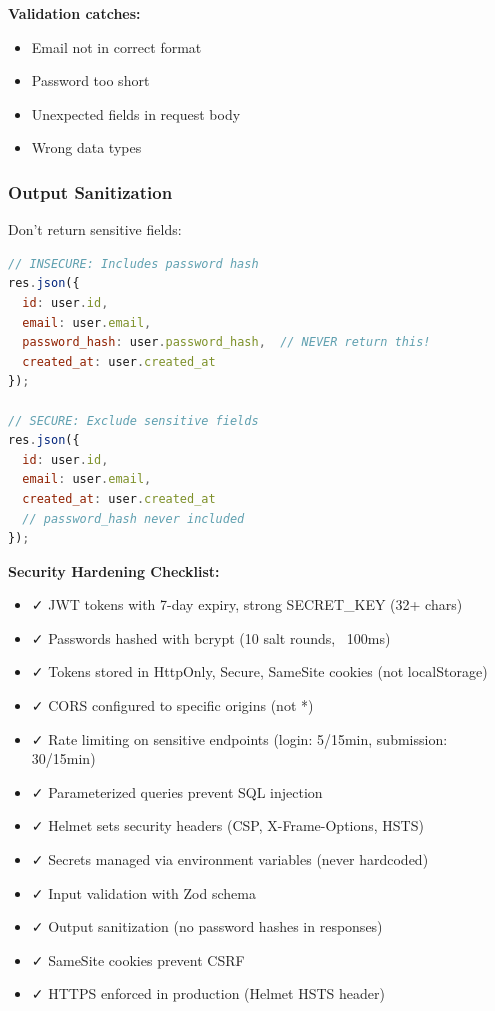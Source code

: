 \documentclass[12pt,a4paper,oneside]{article}
\begin{document}
\textbf{Validation catches:}

\begin{itemize}
    \item Email not in correct format
    \item Password too short
    \item Unexpected fields in request body
    \item Wrong data types
\end{itemize}

\subsubsection{Output Sanitization}

Don't return sensitive fields:

\begin{lstlisting}[language=JavaScript, caption=Sanitized Response]
// INSECURE: Includes password hash
res.json({
  id: user.id,
  email: user.email,
  password_hash: user.password_hash,  // NEVER return this!
  created_at: user.created_at
});

// SECURE: Exclude sensitive fields
res.json({
  id: user.id,
  email: user.email,
  created_at: user.created_at
  // password_hash never included
});
\end{lstlisting}

\begin{importantbox}
\textbf{Security Hardening Checklist:}

\begin{itemize}
    \item ✓ JWT tokens with 7-day expiry, strong SECRET_KEY (32+ chars)
    \item ✓ Passwords hashed with bcrypt (10 salt rounds, ~100ms)
    \item ✓ Tokens stored in HttpOnly, Secure, SameSite cookies (not localStorage)
    \item ✓ CORS configured to specific origins (not *)
    \item ✓ Rate limiting on sensitive endpoints (login: 5/15min, submission: 30/15min)
    \item ✓ Parameterized queries prevent SQL injection
    \item ✓ Helmet sets security headers (CSP, X-Frame-Options, HSTS)
    \item ✓ Secrets managed via environment variables (never hardcoded)
    \item ✓ Input validation with Zod schema
    \item ✓ Output sanitization (no password hashes in responses)
    \item ✓ SameSite cookies prevent CSRF
    \item ✓ HTTPS enforced in production (Helmet HSTS header)
\end{itemize}
\end{importantbox}
\end{document}
